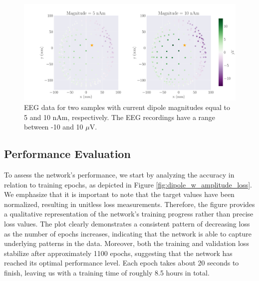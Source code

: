 \documentclass[a4paper, UKenglish, 11pt]{uiomaster}
\begin{document}
\begin{figure}[!htb]
    \centering
    \includegraphics[width=\linewidth]{figures/purple_green/dipole_w_amplitude_example.pdf}
    \caption{EEG data for two samples with current dipole magnitudes equal to 5 and 10 nAm, respectively. The EEG recordings have a range between -10 and 10 $\mu$V.}
    \label{fig:dipole_w_amplitude_example}
\end{figure}


\subsection{Performance Evaluation}
To assess the network's performance, we start by analyzing the accuracy in relation to training epochs, as depicted in Figure \ref{fig:dipole_w_amplitude_loss}. We emphasize that it is important to note that the target values have been normalized, resulting in unitless loss measurements. Therefore, the figure provides a qualitative representation of the network's training progress rather than precise loss values. The plot clearly demonstrates a consistent pattern of decreasing loss as the number of epochs increases, indicating that the network is able to capture underlying patterns in the data. Moreover, both the training and validation loss stabilize after approximately 1100 epochs, suggesting that the network has reached its optimal performance level. Each epoch takes about 20 seconds to finish, leaving us with a training time of roughly 8.5 hours in total.
\end{document}
